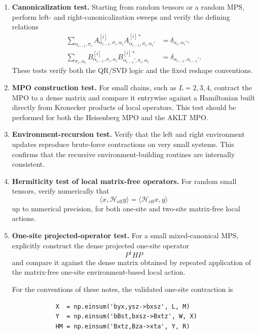 \documentclass[aps,prb,onecolumn,nofootinbib]{revtex4-2}
\begin{document}
	\begin{enumerate}
		\item \textbf{Canonicalization test.}
		Starting from random tensors or a random MPS, perform left- and right-canonicalization
		sweeps and verify the defining relations
		\begin{align}
			\sum_{\alpha_{i-1},\sigma_i}
			A^{[i]}_{\alpha_{i-1},\sigma_i,\alpha_i}
			A^{[i]*}_{\alpha_{i-1},\sigma_i,\alpha_i'}
			&= \delta_{\alpha_i,\alpha_i'},
			\\
			\sum_{\sigma_i,\alpha_i}
			B^{[i]}_{\alpha_{i-1},\sigma_i,\alpha_i}
			B^{[i]*}_{\alpha_{i-1}',\sigma_i,\alpha_i}
			&= \delta_{\alpha_{i-1},\alpha_{i-1}'}.
		\end{align}
		These tests verify both the QR/SVD logic and the fixed reshape conventions.
		
		\item \textbf{MPO construction test.}
		For small chains, such as $L=2,3,4$, contract the MPO to a dense matrix and compare
		it entrywise against a Hamiltonian built directly from Kronecker products of local operators.
		This test should be performed for both the Heisenberg MPO and the AKLT MPO.
		
		\item \textbf{Environment-recursion test.}
		Verify that the left and right environment updates reproduce brute-force contractions
		on very small systems. This confirms that the recursive environment-building routines are
		internally consistent.
		
		\item \textbf{Hermiticity test of local matrix-free operators.}
		For random small tensors, verify numerically that
		\[
		\langle x,\mathcal{H}_{\mathrm{eff}} y\rangle
		=
		\langle \mathcal{H}_{\mathrm{eff}} x, y\rangle
		\]
		up to numerical precision, for both one-site and two-site matrix-free local actions.
		
		\item \textbf{One-site projected-operator test.}
		For a small mixed-canonical MPS, explicitly construct the dense projected one-site operator
		\[
		P^\dagger H P
		\]
		and compare it against the dense matrix obtained by repeated application of the matrix-free
		one-site environment-based local action.
		
		For the conventions of these notes, the validated one-site contraction is
		\begin{verbatim}
			X  = np.einsum('byx,ysz->bxsz', L, M)
			Y  = np.einsum('bBst,bxsz->Bxtz', W, X)
			HM = np.einsum('Bxtz,Bza->xta', Y, R)
		\end{verbatim}
		

\end{enumerate}
\end{document}
